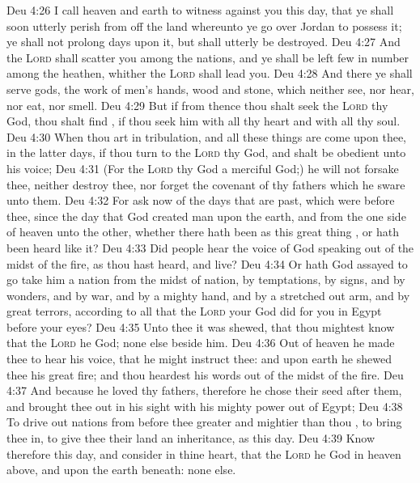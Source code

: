 \vs Deu 4:26 I call heaven and earth to witness against you this day, that ye shall soon utterly perish from off the land whereunto ye go over Jordan to possess it; ye shall not prolong  days upon it, but shall utterly be destroyed.
\vs Deu 4:27 And the \textsc{Lord} shall scatter you among the nations, and ye shall be left few in number among the heathen, whither the \textsc{Lord} shall lead you.
\vs Deu 4:28 And there ye shall serve gods, the work of men's hands, wood and stone, which neither see, nor hear, nor eat, nor smell.
\vs Deu 4:29 But if from thence thou shalt seek the \textsc{Lord} thy God, thou shalt find , if thou seek him with all thy heart and with all thy soul.
\vs Deu 4:30 When thou art in tribulation, and all these things are come upon thee,  in the latter days, if thou turn to the \textsc{Lord} thy God, and shalt be obedient unto his voice;
\vs Deu 4:31 (For the \textsc{Lord} thy God  a merciful God;) he will not forsake thee, neither destroy thee, nor forget the covenant of thy fathers which he sware unto them.
\vs Deu 4:32 For ask now of the days that are past, which were before thee, since the day that God created man upon the earth, and  from the one side of heaven unto the other, whether there hath been  as this great thing , or hath been heard like it?
\vs Deu 4:33 Did  people hear the voice of God speaking out of the midst of the fire, as thou hast heard, and live?
\vs Deu 4:34 Or hath God assayed to go  take him a nation from the midst of  nation, by temptations, by signs, and by wonders, and by war, and by a mighty hand, and by a stretched out arm, and by great terrors, according to all that the \textsc{Lord} your God did for you in Egypt before your eyes?
\vs Deu 4:35 Unto thee it was shewed, that thou mightest know that the \textsc{Lord} he  God;  none else beside him.
\vs Deu 4:36 Out of heaven he made thee to hear his voice, that he might instruct thee: and upon earth he shewed thee his great fire; and thou heardest his words out of the midst of the fire.
\vs Deu 4:37 And because he loved thy fathers, therefore he chose their seed after them, and brought thee out in his sight with his mighty power out of Egypt;
\vs Deu 4:38 To drive out nations from before thee greater and mightier than thou , to bring thee in, to give thee their land  an inheritance, as  this day.
\vs Deu 4:39 Know therefore this day, and consider  in thine heart, that the \textsc{Lord} he  God in heaven above, and upon the earth beneath:  none else.
